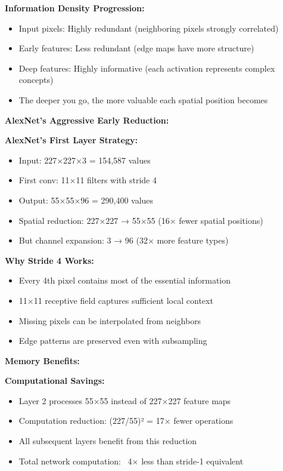 \documentclass[12pt]{article}
\newcommand{\explanation}[1]{{\color{explanationcolor}#1}}
\begin{document}
\begin{enumerate}[(a)]
{{    \textbf{Information Density Progression:}
    \begin{itemize}
        \item Input pixels: Highly redundant (neighboring pixels strongly correlated)
        \item Early features: Less redundant (edge maps have more structure)
        \item Deep features: Highly informative (each activation represents complex concepts)
        \item The deeper you go, the more valuable each spatial position becomes
    \end{itemize}
    }
    
    \textbf{AlexNet's Aggressive Early Reduction:}
    
    \explanation{
    \textbf{AlexNet's First Layer Strategy:}
    \begin{itemize}
        \item Input: 227×227×3 = 154,587 values
        \item First conv: 11×11 filters with stride 4
        \item Output: 55×55×96 = 290,400 values
        \item Spatial reduction: 227×227 → 55×55 (16× fewer spatial positions)
        \item But channel expansion: 3 → 96 (32× more feature types)
    \end{itemize}
    
    \textbf{Why Stride 4 Works:}
    \begin{itemize}
        \item Every 4th pixel contains most of the essential information
        \item 11×11 receptive field captures sufficient local context
        \item Missing pixels can be interpolated from neighbors
        \item Edge patterns are preserved even with subsampling
    \end{itemize}
    }
    
    \textbf{Memory Benefits:}
    
    \explanation{
    \textbf{Computational Savings:}
    \begin{itemize}
        \item Layer 2 processes 55×55 instead of 227×227 feature maps
        \item Computation reduction: (227/55)² = 17× fewer operations
        \item All subsequent layers benefit from this reduction
        \item Total network computation: ~4× less than stride-1 equivalent
    \end{itemize}
    
}}
\end{enumerate}
\end{document}
